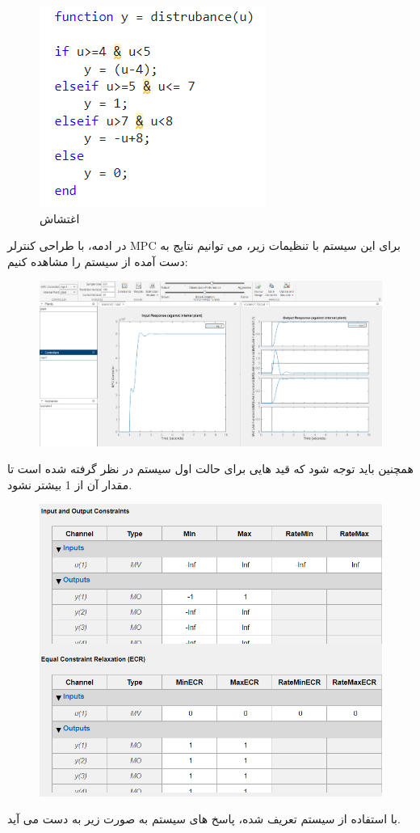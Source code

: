 \begin{figure}[H]
	\centering
	\includegraphics[width=0.4\linewidth]{../img/3}
	\caption{اغتشاش}
	\label{fig:3}
\end{figure}
در ادمه، با طراحی کنترلر MPC برای این سیستم با تنظیمات زیر، می توانیم نتایج به دست آمده از سیستم را مشاهده کنیم:

\begin{figure}[H]
	\centering
	\includegraphics[width=1\linewidth]{../img/4}
	\caption{}
	\label{fig:4}
\end{figure}
همچنین باید توجه شود که قید هایی برای حالت اول سیستم در نظر گرفته شده است تا مقدار آن از 1 بیشتر نشود. 

\begin{figure}[H]
	\centering
	\includegraphics[width=1\linewidth]{../img/5}
	\caption{}
	\label{fig:5}
\end{figure}
با استفاده از سیستم تعریف شده، پاسخ های سیستم به صورت زیر به دست می آید.

